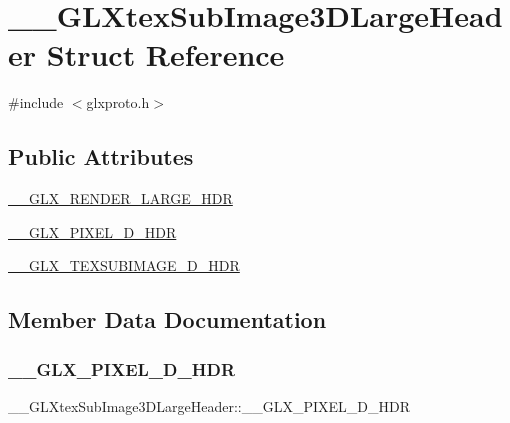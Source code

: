 \hypertarget{struct_____g_l_xtex_sub_image3_d_large_header}{}\section{\+\_\+\+\_\+\+G\+L\+Xtex\+Sub\+Image3\+D\+Large\+Header Struct Reference}
\label{struct_____g_l_xtex_sub_image3_d_large_header}


{\ttfamily \#include $<$glxproto.\+h$>$}

\subsection*{Public Attributes}
\begin{DoxyCompactItemize}
\item 
\hyperlink{struct_____g_l_xtex_sub_image3_d_large_header_a5b7257a9057126e8efd410463331ca48}{\+\_\+\+\_\+\+G\+L\+X\+\_\+\+R\+E\+N\+D\+E\+R\+\_\+\+L\+A\+R\+G\+E\+\_\+\+H\+DR}
\item 
\hyperlink{struct_____g_l_xtex_sub_image3_d_large_header_abd9e9ef4014d806ba7faff06cc80e6d1}{\+\_\+\+\_\+\+G\+L\+X\+\_\+\+P\+I\+X\+E\+L\+\_\+D\+\_\+\+H\+DR}
\item 
\hyperlink{struct_____g_l_xtex_sub_image3_d_large_header_a3213011138410767811dab1351a48a2d}{\+\_\+\+\_\+\+G\+L\+X\+\_\+\+T\+E\+X\+S\+U\+B\+I\+M\+A\+G\+E\+\_\+D\+\_\+\+H\+DR}
\end{DoxyCompactItemize}


\subsection{Member Data Documentation}
\mbox{\label{struct_____g_l_xtex_sub_image3_d_large_header_abd9e9ef4014d806ba7faff06cc80e6d1}} 
\subsubsection{\texorpdfstring{\+\_\+\+\_\+\+G\+L\+X\+\_\+\+P\+I\+X\+E\+L\+\_\+D\+\_\+\+H\+DR}{\_\_GLX\_PIXEL\_3D\_HDR}}
{\footnotesize\ttfamily \+\_\+\+\_\+\+G\+L\+Xtex\+Sub\+Image3\+D\+Large\+Header\+::\+\_\+\+\_\+\+G\+L\+X\+\_\+\+P\+I\+X\+E\+L\+\_\+D\+\_\+\+H\+DR}

